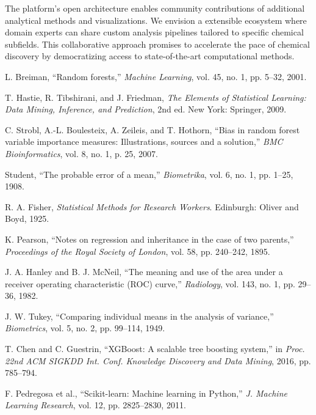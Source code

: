 \documentclass[conference]{IEEEtran}
\begin{document}
The platform's open architecture enables community contributions of additional analytical methods and visualizations. We envision a extensible ecosystem where domain experts can share custom analysis pipelines tailored to specific chemical subfields. This collaborative approach promises to accelerate the pace of chemical discovery by democratizing access to state-of-the-art computational methods.

\begin{thebibliography}{00}
 L. Breiman, ``Random forests,'' \textit{Machine Learning}, vol. 45, no. 1, pp. 5--32, 2001.

 T. Hastie, R. Tibshirani, and J. Friedman, \textit{The Elements of Statistical Learning: Data Mining, Inference, and Prediction}, 2nd ed. New York: Springer, 2009.

 C. Strobl, A.-L. Boulesteix, A. Zeileis, and T. Hothorn, ``Bias in random forest variable importance measures: Illustrations, sources and a solution,'' \textit{BMC Bioinformatics}, vol. 8, no. 1, p. 25, 2007.

 Student, ``The probable error of a mean,'' \textit{Biometrika}, vol. 6, no. 1, pp. 1--25, 1908.

 R. A. Fisher, \textit{Statistical Methods for Research Workers}. Edinburgh: Oliver and Boyd, 1925.

 K. Pearson, ``Notes on regression and inheritance in the case of two parents,'' \textit{Proceedings of the Royal Society of London}, vol. 58, pp. 240--242, 1895.

 J. A. Hanley and B. J. McNeil, ``The meaning and use of the area under a receiver operating characteristic (ROC) curve,'' \textit{Radiology}, vol. 143, no. 1, pp. 29--36, 1982.

 J. W. Tukey, ``Comparing individual means in the analysis of variance,'' \textit{Biometrics}, vol. 5, no. 2, pp. 99--114, 1949.

 T. Chen and C. Guestrin, ``XGBoost: A scalable tree boosting system,'' in \textit{Proc. 22nd ACM SIGKDD Int. Conf. Knowledge Discovery and Data Mining}, 2016, pp. 785--794.

 F. Pedregosa et al., ``Scikit-learn: Machine learning in Python,'' \textit{J. Machine Learning Research}, vol. 12, pp. 2825--2830, 2011.


\end{thebibliography}
\end{document}
